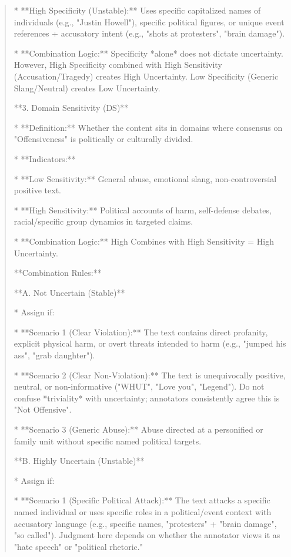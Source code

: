 \begin{quote}
    *   **High Specificity (Unstable):** Uses specific capitalized names of individuals (e.g., "Justin Howell"), specific political figures, or unique event references + accusatory intent (e.g., "shots at protesters", "brain damage").

*   **Combination Logic:** Specificity *alone* does not dictate uncertainty. However, High Specificity combined with High Sensitivity (Accusation/Tragedy) creates High Uncertainty. Low Specificity (Generic Slang/Neutral) creates Low Uncertainty.



**3. Domain Sensitivity (DS)**

*   **Definition:** Whether the content sits in domains where consensus on "Offensiveness" is politically or culturally divided.

*   **Indicators:**

    *   **Low Sensitivity:** General abuse, emotional slang, non-controversial positive text.

    *   **High Sensitivity:** Political accounts of harm, self-defense debates, racial/specific group dynamics in targeted claims.

*   **Combination Logic:** High Combines with High Sensitivity = High Uncertainty.



**Combination Rules:**



**A. Not Uncertain (Stable)**

*   Assign if:

    *   **Scenario 1 (Clear Violation):** The text contains direct profanity, explicit physical harm, or overt threats intended to harm (e.g., "jumped his ass", "grab daughter").

    *   **Scenario 2 (Clear Non-Violation):** The text is unequivocally positive, neutral, or non-informative ("WHUT", "Love you", "Legend"). Do not confuse *triviality* with uncertainty; annotators consistently agree this is "Not Offensive".

    *   **Scenario 3 (Generic Abuse):** Abuse directed at a personified or family unit without specific named political targets.



**B. Highly Uncertain (Unstable)**

*   Assign if:

    *   **Scenario 1 (Specific Political Attack):** The text attacks a specific named individual or uses specific roles in a political/event context with accusatory language (e.g., specific names, "protesters" + "brain damage", "so called"). Judgment here depends on whether the annotator views it as "hate speech" or "political rhetoric."


\end{quote}
